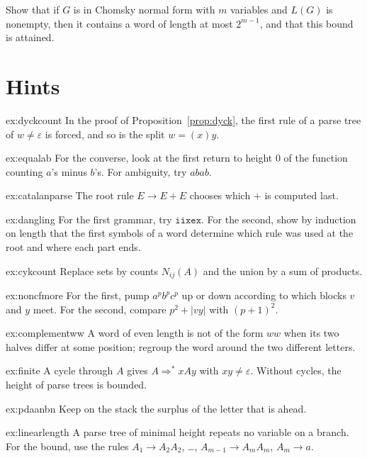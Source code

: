 \begin{exercise}[$\star\star$]\label{ex:linearlength}
Show that if $G$ is in Chomsky normal form with $m$ variables and $L(G)$ is nonempty, then it contains a word of length at most $2^{m-1}$, and that this bound is attained.
\end{exercise}

\section{Hints}

\begin{hint}{ex:dyckcount}
In the proof of Proposition~\ref{prop:dyck}, the first rule of a parse tree of $w\ne\varepsilon$ is forced, and so is the split $w=(x)y$.
\end{hint}
\begin{hint}{ex:equalab}
For the converse, look at the first return to height $0$ of the function counting $a$'s minus $b$'s. For ambiguity, try $abab$.
\end{hint}
\begin{hint}{ex:catalanparse}
The root rule $E\to E+E$ chooses which $+$ is computed last.
\end{hint}
\begin{hint}{ex:dangling}
For the first grammar, try $\texttt{iixex}$. For the second, show by induction on length that the first symbols of a word determine which rule was used at the root and where each part ends.
\end{hint}
\begin{hint}{ex:cykcount}
Replace sets by counts $N_{ij}(A)$ and the union by a sum of products.
\end{hint}
\begin{hint}{ex:noncfmore}
For the first, pump $a^pb^pc^p$ up or down according to which blocks $v$ and $y$ meet. For the second, compare $p^2+|vy|$ with $(p+1)^2$.
\end{hint}
\begin{hint}{ex:complementww}
A word of even length is not of the form $ww$ when its two halves differ at some position; regroup the word around the two different letters.
\end{hint}
\begin{hint}{ex:finite}
A cycle through $A$ gives $A\Rightarrow^*xAy$ with $xy\ne\varepsilon$. Without cycles, the height of parse trees is bounded.
\end{hint}
\begin{hint}{ex:pdaanbn}
Keep on the stack the surplus of the letter that is ahead.
\end{hint}
\begin{hint}{ex:linearlength}
A parse tree of minimal height repeats no variable on a branch. For the bound, use the rules $A_1\to A_2A_2$, \dots, $A_{m-1}\to A_mA_m$, $A_m\to a$.
\end{hint}


